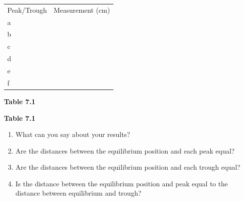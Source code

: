           \begin{table}[H]
        \begin{center}
      \label{m38806*id318048}
    \noindent
      \tablelasttail{}
      \begin{xtabular}[t]{|l|l|}\hline
        Peak/Trough &
        Measurement (cm)%
     \tabularnewline{}
        a &
     \tabularnewline{}
        b &
     \tabularnewline{}
        c &
     \tabularnewline{}
        d &
     \tabularnewline{}
        e &
     \tabularnewline{}
        f &
     \tabularnewline{}
    \end{xtabular}
      \end{center}
    \begin{center}{\small\bfseries Table 7.1}\end{center}
    \begin{caption}{\small\bfseries Table 7.1}\end{caption}
\end{table}
    \par
        \label{m38806*id318366}\begin{enumerate}[noitemsep, label=\textbf{\arabic*}. ] 
            \label{m38806*uid11}\item What can you say about your results?
\label{m38806*uid12}\item Are the distances between the equilibrium position and each peak equal?
\label{m38806*uid13}\item Are the distances between the equilibrium position and each trough equal?
\label{m38806*uid14}\item Is the distance between the equilibrium position and peak equal to the distance between equilibrium and trough?
\end{enumerate}
